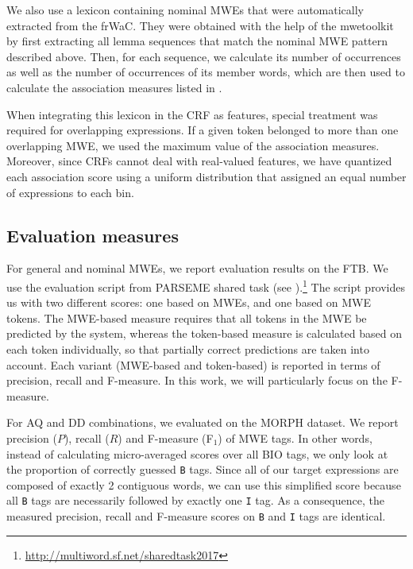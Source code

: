 \documentclass[output=paper,
modfonts
]{langscibook}
\begin{document}
We also use a lexicon containing nominal MWEs that were automatically extracted from the frWaC. They were obtained with the help of the mwetoolkit by first extracting all lemma sequences that match the nominal MWE pattern described above. Then, for each sequence, we calculate its number of occurrences as well as the number of occurrences of its member words, which are then used to calculate the association measures listed in . 

When integrating this lexicon in the CRF as features, special treatment was required for overlapping expressions. If a given token belonged to more than one overlapping MWE, we used the maximum value of the association measures. Moreover, since CRFs cannot deal with real-valued features, we have quantized each association score using a uniform distribution that assigned an equal number of expressions to each bin. %


\subsection{Evaluation measures}
\label{subsec:evalmeas}

For general and nominal MWEs, we report evaluation results on the FTB. We use the evaluation script from PARSEME shared task (see ).\footnote{\url{http://multiword.sf.net/sharedtask2017}} The script provides us with two different scores: one based on MWEs, and one based on MWE tokens. The MWE-based measure requires that all tokens in the MWE be predicted by the system, whereas the token-based measure is calculated based on each token individually, so that partially correct predictions are taken into account. Each variant (MWE-based and token-based) is reported in terms of precision, recall and F-measure. In this work, we will particularly focus on the F-measure. 

For AQ and DD combinations, we evaluated on the MORPH dataset. We report precision ($P$), recall ($R$) and F-measure (F$_1$) of MWE tags. In other words, instead of calculating micro-averaged scores over all BIO tags, we only look at the proportion of correctly guessed \texttt{B} tags.
Since all of our target expressions are composed of exactly 2 contiguous words, we can use this simplified score because all \texttt{B} tags are necessarily followed by exactly one \texttt{I} tag. As a consequence, the measured precision, recall and F-measure scores on \texttt{B} and \texttt{I} tags are identical.
\end{document}
